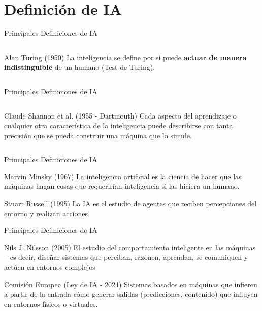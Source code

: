 \documentclass[aspectratio=169]{beamer}
\begin{document}
\section{Definición de IA}

\begin{frame}[t]{Principales Definiciones de IA}
\begin{columns}
    \begin{block}{Alan Turing (1950)}
        La inteligencia se define por si puede \textbf{actuar de manera indistinguible} de un humano (Test de Turing).
    \end{block}

\end{columns}
\end{frame}
\begin{frame}[t]{Principales Definiciones de IA}
\begin{columns}
    \begin{block}{Claude Shannon et al. (1955 - Dartmouth)}
        Cada aspecto del aprendizaje o cualquier otra característica de la inteligencia puede describirse con tanta precisión que se pueda construir una máquina que lo simule.
    \end{block}
\end{columns}
\end{frame}

\begin{frame}[t]{Principales Definiciones de IA}
    \begin{block}{Marvin Minsky (1967)}
        La inteligencia artificial es la ciencia de hacer que las máquinas hagan cosas que requerirían inteligencia si las hiciera un humano.
    \end{block}
    
    \begin{block}{Stuart Russell (1995)}
        La IA es el estudio de agentes que reciben percepciones del entorno y realizan acciones.
    \end{block}
\end{frame}

\begin{frame}[t]{Principales Definiciones de IA}
    \begin{block}{Nils J. Nilsson (2005)}
        El estudio del comportamiento inteligente en las máquinas – es decir, diseñar sistemas que perciban, razonen, aprendan, se comuniquen y actúen en entornos complejos
    \end{block}

    \begin{block}{Comisión Europea (Ley de IA - 2024)}
        Sistemas basados en máquinas que {infieren} a partir de la entrada cómo generar salidas (predicciones, contenido) que {influyen} en entornos físicos o virtuales.
    \end{block}
\end{frame}
\end{document}
